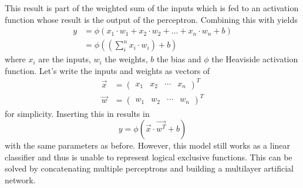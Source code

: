 This result is part of the weighted sum of the inputs which is fed to an activation function whose result is the output of the perceptron.
Combining this with  yields
\begin{align}
	\label{eq:perceptron-sum}
	y &= \phi \left( x_1 \cdot w_1 + x_2 \cdot w_2 + \ldots + x_n \cdot w_n + b \right)\\
	  &= \phi \left( \left( \sum_{i}^{n} x_i \cdot w_i \right) + b \right)
\end{align}
where $x_i$ are the inputs, $w_i$ the weights, $b$ the bias and $\phi$ the Heaviside activation function.
Let's write the inputs and weights as vectors of
\begin{align}
	\vec{x} &= \begin{pmatrix} x_1 & x_2 & \cdots & x_n \end{pmatrix}^T \\
	\vec{w} &= \begin{pmatrix} w_1 & w_2 & \cdots & w_n \end{pmatrix}^T 
\end{align}
for simplicity.
Inserting this in  results in
\begin{equation}
	\label{eq:perceptron-activation}
	y = \phi \left( \vec{x} \cdot \vec{w^T} + b \right)
\end{equation}
with the same parameters as before.
However, this model still works as a linear classifier and thus is unable to represent logical exclusive functions.
This can be solved by concatenating multiple perceptrons and building a multilayer artificial network.
